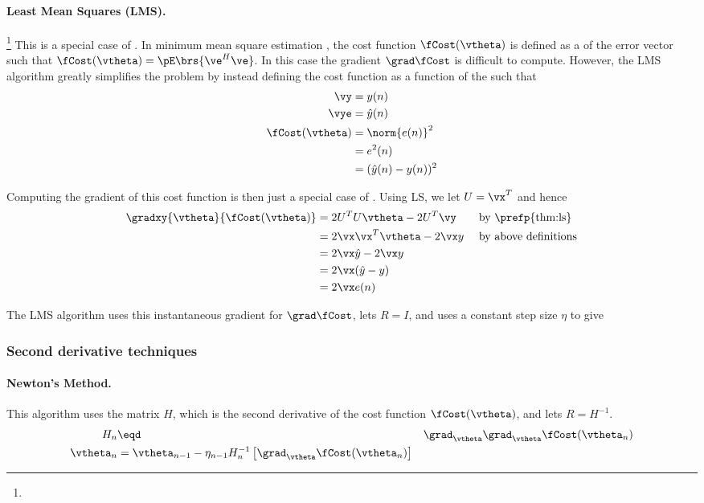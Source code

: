 \paragraph{Least Mean Squares (LMS).}\footnote{}
This is a special case of .
In minimum mean square estimation ,
the cost function $\fCost(\vtheta)$ is defined as a
 of the error vector such that
$\fCost(\vtheta) = \pE\brs{\ve^H\ve}$.
In this case the gradient $\grad\fCost$ is difficult to compute.
However, the LMS algorithm greatly simplifies the problem by
instead defining the cost function as a function of the
 such that
\begin{align*}
   \vy &= y(n)
\\
   \vye &= \hat{y}(n)
\\
   \fCost(\vtheta)
   &= \norm{e(n)}^2
 \\&= e^2(n)
 \\&= (\hat{y}(n)-y(n))^2
\end{align*}

Computing the gradient of this cost function is then
just a special case of  .
Using LS, we let $U=\vx^T$ and hence
\begin{align*}
   \gradxy{\vtheta}{\fCost(\vtheta)}
   &= 2U^TU \vtheta -2U^T\vy                   && \text{ by \prefp{thm:ls}}
\\ &= 2\vx\vx^T \vtheta -2\vx y               && \text{ by above definitions}
\\ &= 2\vx\hat{y} -2\vx y                    && \text{ }
\\ &= 2\vx(\hat{y} -y)                      && \text{ }
\\ &= 2\vx e(n)                && \text{ }
\end{align*}

The LMS algorithm uses this instantaneous gradient for $\grad\fCost$,
lets $R=I$, and uses a constant step size $\eta$ to give
\subsubsection*{Second derivative techniques}
\paragraph{Newton's Method.}
This algorithm uses the  matrix $H$,
which is the second derivative of the cost function $\fCost(\vtheta)$,
and lets $R=H^{-1}$.
\begin{align*}
   H_n &\eqd& \grad_\vtheta\grad_\vtheta \fCost(\vtheta_n)
\\
   \vtheta_n &= \vtheta_{n-1} - \eta_{n-1} H_n^{-1} \left[\grad_\vtheta\fCost(\vtheta_n)\right]
\end{align*}


